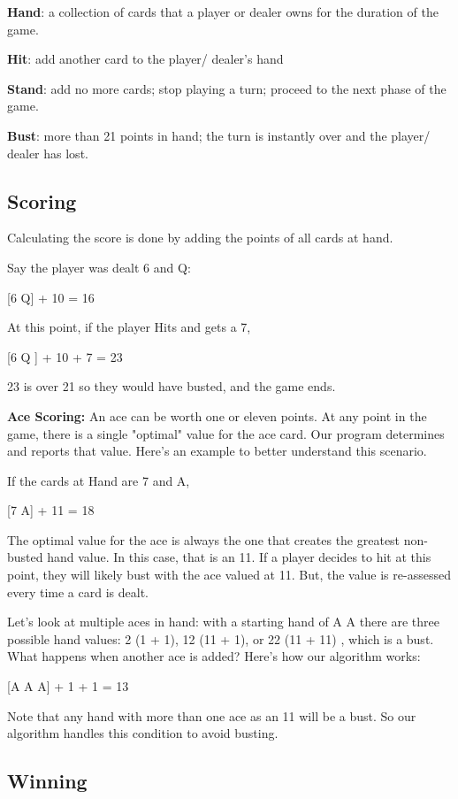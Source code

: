 \documentclass[12pt]{article}
\begin{document}
\textbf{Hand}: a collection of cards that a player or dealer owns for the duration of the game.

\textbf{Hit}: add another card to the player/ dealer's hand

\textbf{Stand}: add no more cards; stop playing a turn; proceed to the next phase of the game.

\textbf{Bust}: more than 21 points in hand; the turn is instantly over and the player/ dealer has lost.

\subsection{Scoring}

Calculating the score is done by adding the points of all cards at hand. 

Say the player was dealt 6 and Q:

[6 \quad Q]  + 10 = 16

At this point, if the player Hits and gets a 7,

[6 \quad Q ]  + 10 + 7 = 23

23 is over 21 so they would have busted, and the game ends.

\textbf{Ace Scoring:} An ace can be worth one or eleven points. At any point in the game, there is a single "optimal" value for the ace card. Our program determines and reports that value. Here's an example to better understand this scenario. 

If the cards at Hand are 7 and A,

[7 \quad A]  + 11 = 18

The optimal value for the ace is always the one that creates the greatest non-busted hand value. In this case, that is an 11. If a player decides to hit at this point, they will likely bust with the ace valued at 11. But, the value is re-assessed every time a card is dealt. 

Let's look at multiple aces in hand: with a starting hand of A A there are three possible hand values: 2 (1 + 1), 12 (11 + 1), or 22 (11 + 11) , which is a bust. What happens when another ace is added? Here's how our algorithm works:

[A \quad A \quad A]  + 1 + 1 = 13

Note that any hand with more than one ace as an 11 will be a bust. So our algorithm handles this condition to avoid busting.

\subsection{Winning}
\end{document}
